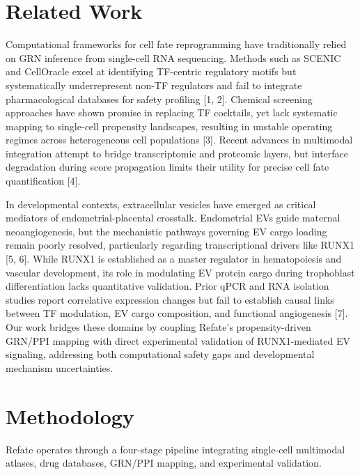\documentclass[11pt,a4paper]{article}
\begin{document}
\section{Related Work}
Computational frameworks for cell fate reprogramming have traditionally relied on GRN inference from single-cell RNA sequencing. Methods such as SCENIC and CellOracle excel at identifying TF-centric regulatory motifs but systematically underrepresent non-TF regulators and fail to integrate pharmacological databases for safety profiling [1, 2]. Chemical screening approaches have shown promise in replacing TF cocktails, yet lack systematic mapping to single-cell propensity landscapes, resulting in unstable operating regimes across heterogeneous cell populations [3]. Recent advances in multimodal integration attempt to bridge transcriptomic and proteomic layers, but interface degradation during score propagation limits their utility for precise cell fate quantification [4]. 

In developmental contexts, extracellular vesicles have emerged as critical mediators of endometrial-placental crosstalk. Endometrial EVs guide maternal neoangiogenesis, but the mechanistic pathways governing EV cargo loading remain poorly resolved, particularly regarding transcriptional drivers like RUNX1 [5, 6]. While RUNX1 is established as a master regulator in hematopoiesis and vascular development, its role in modulating EV protein cargo during trophoblast differentiation lacks quantitative validation. Prior qPCR and RNA isolation studies report correlative expression changes but fail to establish causal links between TF modulation, EV cargo composition, and functional angiogenesis [7]. Our work bridges these domains by coupling Refate's propensity-driven GRN/PPI mapping with direct experimental validation of RUNX1-mediated EV signaling, addressing both computational safety gaps and developmental mechanism uncertainties.

\section{Methodology}
Refate operates through a four-stage pipeline integrating single-cell multimodal atlases, drug databases, GRN/PPI mapping, and experimental validation.
\end{document}
